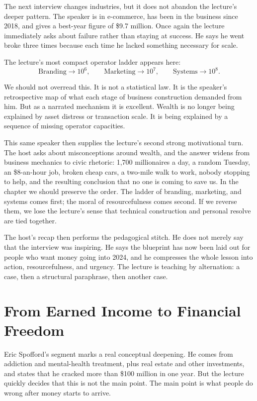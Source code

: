 The next interview changes industries, but it does not abandon the lecture's deeper pattern. The speaker is in e-commerce, has been in the business since 2018, and gives a best-year figure of \$9.7 million. Once again the lecture immediately asks about failure rather than staying at success. He says he went broke three times because each time he lacked something necessary for scale.

The lecture's most compact operator ladder appears here:
\begin{equation}
\text{Branding}\rightarrow 10^6,\qquad
\text{Marketing}\rightarrow 10^7,\qquad
\text{Systems}\rightarrow 10^8.
\end{equation}

We should not overread this. It is not a statistical law. It is the speaker's retrospective map of what each stage of business construction demanded from him. But as a narrated mechanism it is excellent. Wealth is no longer being explained by asset distress or transaction scale. It is being explained by a sequence of missing operator capacities.

This same speaker then supplies the lecture's second strong motivational turn. The host asks about misconceptions around wealth, and the answer widens from business mechanics to civic rhetoric: 1{,}700 millionaires a day, a random Tuesday, an \$8-an-hour job, broken cheap cars, a two-mile walk to work, nobody stopping to help, and the resulting conclusion that no one is coming to save us. In the chapter we should preserve the order. The ladder of branding, marketing, and systems comes first; the moral of resourcefulness comes second. If we reverse them, we lose the lecture's sense that technical construction and personal resolve are tied together.

The host's recap then performs the pedagogical stitch. He does not merely say that the interview was inspiring. He says the blueprint has now been laid out for people who want money going into 2024, and he compresses the whole lesson into action, resourcefulness, and urgency. The lecture is teaching by alternation: a case, then a structural paraphrase, then another case.

\section{From Earned Income to Financial Freedom}

Eric Spofford's segment marks a real conceptual deepening. He comes from addiction and mental-health treatment, plus real estate and other investments, and states that he cracked more than \$100 million in one year. But the lecture quickly decides that this is not the main point. The main point is what people do wrong after money starts to arrive.

